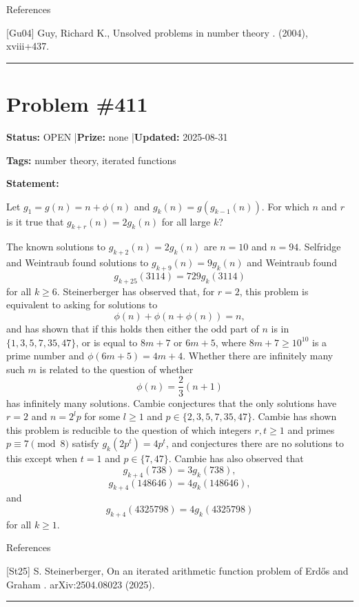 \documentclass{article}
\begin{document}
References

[Gu04] Guy, Richard K., Unsolved problems in number theory . (2004), xviii+437.

\noindent\rule{\linewidth}{0.4pt}


\section{Problem \#411}
\label{prob:411}

\noindent\textbf{Status:} OPEN \quad|\quad \textbf{Prize:} none \quad|\quad \textbf{Updated:} 2025-08-31

\noindent\textbf{Tags:} number theory, iterated functions

\medskip

\noindent\textbf{Statement:}

Let $g_1=g(n)=n+\phi(n)$ and $g_k(n)=g(g_{k-1}(n))$. For which $n$ and $r$ is it true that $g_{k+r}(n)=2g_k(n)$ for all large $k$?




The known solutions to $g_{k+2}(n)=2g_k(n)$ are $n=10$ and $n=94$. Selfridge and Weintraub found solutions to $g_{k+9}(n)=9g_k(n)$ and Weintraub found\[g_{k+25}(3114)=729g_k(3114)\]for all $k\geq 6$. Steinerberger \cite{St25} has observed that, for $r=2$, this problem is equivalent to asking for solutions to\[\phi(n)+\phi(n+\phi(n))=n,\]and has shown that if this holds then either the odd part of $n$ is in $\{1,3,5,7,35,47\}$, or is equal to $8m+7$ or $6m+5$, where $8m+7\geq 10^{10}$ is a prime number and $\phi(6m+5)=4m+4$. Whether there are infinitely many such $m$ is related to the question of whether\[\phi(n)=\frac{2}{3}(n+1)\]has infinitely many solutions. Cambie conjectures that the only solutions have $r=2$ and $n=2^lp$ for some $l\geq 1$ and $p\in \{2,3,5,7,35,47\}$. Cambie has shown this problem is reducible to the question of which integers $r,t\geq 1$ and primes $p\equiv 7\pmod{8}$ satisfy $g_k(2p^t)=4p^t$, and conjectures there are no solutions to this except when $t=1$ and $p\in \{7,47\}$. Cambie has also observed that\[g_{k+4}(738)=3g_k(738),\]\[g_{k+4}(148646)=4g_k(148646),\]and\[g_{k+4}(4325798)=4g_{k}(4325798)\]for all $k\geq 1$.




References

[St25] S. Steinerberger, On an iterated arithmetic function problem of Erd\H{o}s and Graham . arXiv:2504.08023 (2025).

\noindent\rule{\linewidth}{0.4pt}
\end{document}
